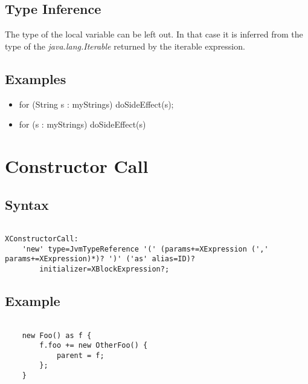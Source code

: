 \documentclass[a4paper,10pt]{scrreprt}
\newlength{\itemindentlen}
\begin{document}
\subsection{ Type Inference }

The type of the local variable can be left out. In that case it is inferred from the type of the \emph{java.lang.Iterable} returned by the iterable expression.




\subsection{ Examples }


\setlength{\itemindentlen}{\textwidth}
\begin{itemize}
\addtolength{\itemindentlen}{-2em}

\item \begin{minipage}[t]{\itemindentlen}

	for (String s : myStrings) {
		doSideEffect(s);
	}
	
\end{minipage}

\item \begin{minipage}[t]{\itemindentlen}

	for (s : myStrings)
		doSideEffect(s)
	
\end{minipage}

\end{itemize}
\addtolength{\itemindentlen}{2em}







\section{Constructor Call}
\label{ConstructorCall}



\subsection{ Syntax }


\begin{lstlisting}

XConstructorCall:
	'new' type=JvmTypeReference '(' (params+=XExpression (',' params+=XExpression)*)? ')' ('as' alias=ID)?
		initializer=XBlockExpression?;

\end{lstlisting}





\subsection{ Example }


\begin{lstlisting}

	new Foo() as f {
		f.foo += new OtherFoo() {
			parent = f;
		};
	}

\end{lstlisting}
\end{document}
